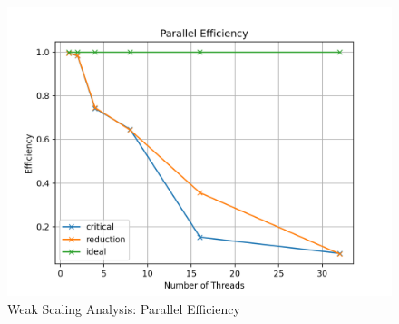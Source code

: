 \documentclass[unicode,11pt,a4paper,oneside,numbers=endperiod,openany]{scrartcl}
\begin{document}
\begin{figure}[H]
    \centering
    \includegraphics[width=\textwidth]{Images_Output/parallel_efficiency.png}
    \caption{Weak Scaling Analysis: Parallel Efficiency}
    \label{fig:weak_scaling}
  \end{figure}
\end{document}
